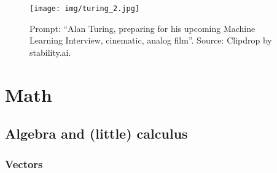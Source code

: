 \documentclass{article}
\begin{document}
\newpage

\begin{figure}[t!]
    \centering
    \texttt{[image: img/turing\_2.jpg]}
    \caption{Prompt: ``Alan Turing, preparing for his upcoming Machine Learning Interview, cinematic, analog film''. Source: Clipdrop by stability.ai.}
    \label{fig:enter-label}
\end{figure}

\newpage

\clearpage %

\section{Math}
\subsection{Algebra and (little) calculus}
\subsubsection{Vectors}
\end{document}
